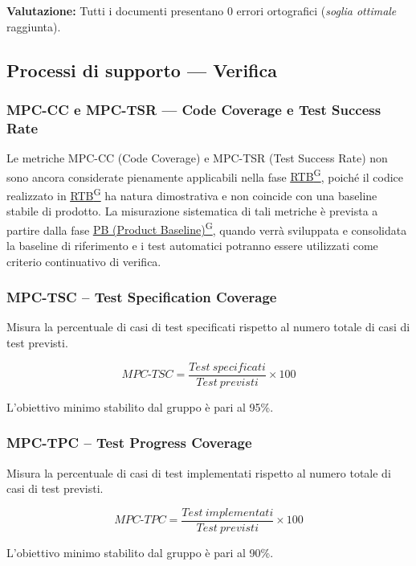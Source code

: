 \documentclass[a4paper,12pt]{article}
\providecommand{\glslink}[2]{\href{https://alittlebyte-19.github.io/Documentazione/glossario.html\#gls-#1}{\underline{#2}\textsuperscript{\scriptsize G}}}
\begin{document}
\noindent\textbf{Valutazione:} Tutti i documenti presentano 0 errori ortografici (\emph{soglia ottimale} raggiunta).

\subsection{Processi di supporto — Verifica}

\subsubsection{MPC-CC e MPC-TSR — Code Coverage e Test Success Rate}

Le metriche MPC-CC (Code Coverage) e MPC-TSR (Test Success Rate) non sono ancora considerate pienamente applicabili nella fase \glslink{rtb-requirements-and-technology-baseline}{RTB}, poiché il codice realizzato in \glslink{rtb-requirements-and-technology-baseline}{RTB} ha natura dimostrativa e non coincide con una baseline stabile di prodotto. La misurazione sistematica di tali metriche è prevista a partire dalla fase \glslink{pb-product-baseline}{PB (Product Baseline)}, quando verrà sviluppata e consolidata la baseline di riferimento e i test automatici potranno essere utilizzati come criterio continuativo di verifica.

\subsubsection{MPC-TSC -- Test Specification Coverage}

Misura la percentuale di casi di test specificati rispetto al numero totale di casi di test previsti.

\[
MPC\text{-}TSC = \frac{Test\ specificati}{Test\ previsti} \times 100
\]

L'obiettivo minimo stabilito dal gruppo è pari al 95\%.

\subsubsection{MPC-TPC -- Test Progress Coverage}

Misura la percentuale di casi di test implementati rispetto al numero totale di casi di test previsti.

\[
MPC\text{-}TPC = \frac{Test\ implementati}{Test\ previsti} \times 100
\]

L'obiettivo minimo stabilito dal gruppo è pari al 90\%.
\end{document}
